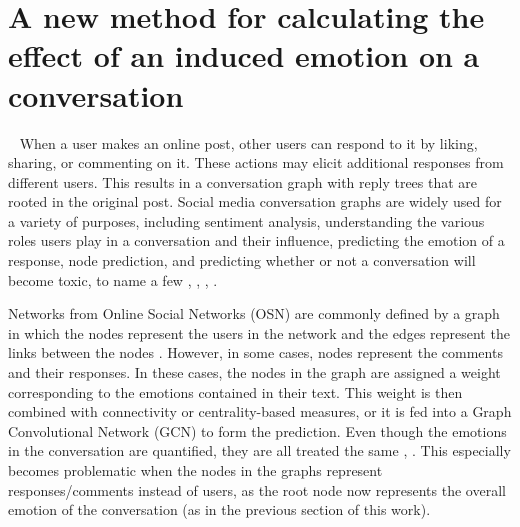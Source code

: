 \newpage 
\section{A new method for calculating the effect of an induced emotion on a conversation}~\label{sec:approach}
When a user makes an online post, other users can respond to it by liking, sharing, or commenting on it. These actions may elicit additional responses from different users. This results in a conversation graph with reply trees that are rooted in the original post. 
Social media conversation graphs are widely used for a variety of purposes, including sentiment analysis, understanding the various roles users play in a conversation and their influence, predicting the emotion of a response, node prediction, and predicting whether or not a conversation will become toxic, to name a few \cite{yang2022implicit}, \cite{zhao2020modeling}, \cite{yang2017social}, \cite{brambilla2021conversation}. 


Networks from Online Social Networks (OSN) are commonly defined by a graph in which the nodes represent the users in the network and the edges represent the links between the nodes \cite{antonakaki2021survey}. However, in some cases, nodes represent the comments and their responses. In these cases, the nodes in the graph are assigned a weight corresponding to the emotions contained in their text. This weight is then combined with connectivity or centrality-based measures, or it is fed into a Graph Convolutional Network (GCN) to form the prediction. Even though the emotions in the conversation are quantified, they are all treated the same \cite{perikos2018framework}, \cite{albadani2022transformer}. This especially becomes problematic when the nodes in the graphs represent responses/comments instead of users, as the root node now represents the overall emotion of the conversation (as in the previous section of this work). 
 

